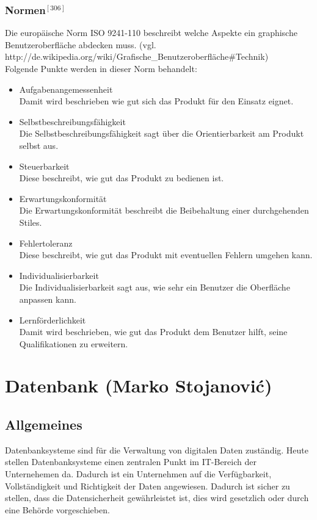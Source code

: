 \documentclass[12pt,a4paper]{report}
\begin{document}
\begin{onehalfspace}
\subsection*{Normen$^{[306]}$}
Die europäische Norm ISO 9241-110 beschreibt welche Aspekte ein graphische Benutzeroberfläche abdecken muss. (vgl. http://de.wikipedia.org/wiki/Grafische\_Benutzeroberfläche\#Technik)\\
Folgende Punkte werden in dieser Norm behandelt:
\begin{itemize}
\item Aufgabenangemessenheit\\
Damit wird beschrieben wie gut sich das Produkt für den Einsatz eignet. 
\item Selbstbeschreibungsfähigkeit\\
Die Selbstbeschreibungsfähigkeit sagt über die Orientierbarkeit am Produkt selbst aus. 
\item Steuerbarkeit\\
Diese beschreibt, wie gut das Produkt zu bedienen ist. 
\item Erwartungskonformität\\
Die Erwartungskonformität beschreibt die Beibehaltung einer durchgehenden Stiles.
\item Fehlertoleranz\\
Diese beschreibt, wie gut das Produkt mit eventuellen Fehlern umgehen kann.
\item Individualisierbarkeit\\
Die Individualisierbarkeit sagt aus, wie sehr ein Benutzer die Oberfläche anpassen kann. 
\item Lernförderlichkeit\\
Damit wird beschrieben, wie gut das Produkt dem Benutzer hilft, seine Qualifikationen zu erweitern. 
\end{itemize}

\chapter{Datenbank (Marko Stojanovi\'{c})}

\section{Allgemeines}
Datenbanksysteme sind für die Verwaltung von digitalen Daten zuständig. Heute stellen Datenbanksysteme einen zentralen Punkt im IT-Bereich der Unternehemen da. Dadurch ist ein Unternehmen auf die Verfügbarkeit, Vollständigkeit und Richtigkeit der Daten angewiesen. Dadurch ist sicher zu stellen, dass die Datensicherheit gewährleistet ist, dies wird gesetzlich oder durch eine Behörde vorgeschieben.\\


\end{onehalfspace}
\end{document}
